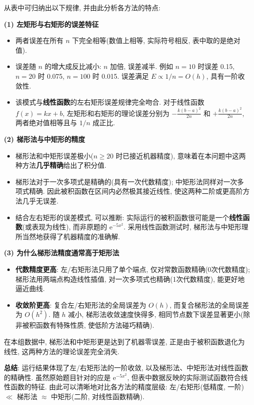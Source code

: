 \documentclass[zihao=-4,a4paper]{ctexart}
\begin{document}
从表中可归纳出以下规律, 并由此分析各方法的特点: 

\textbf{(1) 左矩形与右矩形的误差特征}
\begin{itemize}[rightmargin=0.5cm]
    \item 两者误差在所有 $n$ 下完全相等(数值上相等, 实际符号相反, 表中取的是绝对值). 
    \item 误差随 $n$ 的增大成反比减小: $n$ 加倍, 误差减半. 例如 $n=10$ 时误差 0.15, $n=20$ 时 0.075, $n=100$ 时 0.015. 误差满足 $E \propto 1/n = O(h)$, 具有一阶收敛性. 
    \item 该模式与\textbf{线性函数}的左右矩形误差规律完全吻合. 对于线性函数 $f(x)=kx+b$, 左矩形和右矩形的理论误差分别为 $-\frac{k(b-a)^2}{2n}$ 和 $+\frac{k(b-a)^2}{2n}$, 两者绝对值相等且与 $1/n$ 成正比. 
\end{itemize}

\textbf{(2) 梯形法与中矩形的精度}
\begin{itemize}[rightmargin=0.5cm]
    \item 梯形法和中矩形误差极小($n\ge20$ 时已接近机器精度), 意味着在本问题中这两种方法\textbf{几乎精确}给出了积分值. 
    \item 梯形法对于一次多项式是精确的(具有一次代数精度); 中矩形法同样对一次多项式精确. 因此被积函数在区间内必然极其接近线性, 使这两种二阶或更高阶方法几乎无误差. 
    \item 结合左右矩形的误差模式, 可以推断: 实际运行的被积函数很可能是一个\textbf{线性函数}(或表现为线性), 而非原题的 $\mathrm{e}^{-5x^2}$. 采用线性函数测试时, 梯形法与中矩形理所当然地获得了机器精度的准确解. 
\end{itemize}

\textbf{(3) 为什么梯形法精度通常高于矩形法}
\begin{itemize}[rightmargin=0.5cm]
    \item \textbf{代数精度更高}: 左/右矩形法只用了单个端点, 仅对常数函数精确(0次代数精度); 梯形法用两端点构造线性插值, 对一次多项式也精确(1次代数精度), 能更好地逼近曲线. 
    \item \textbf{收敛阶更高}: 复合左/右矩形法的全局误差为 $O(h)$, 而复合梯形法的全局误差为 $O(h^2)$. 随 $h$ 减小, 梯形法收敛速度快得多, 相同节点数下误差显著更小(除非被积函数有特殊性质, 使低阶方法碰巧精确). 
\end{itemize}

在本组数据中, 梯形法和中矩形更是达到了机器零误差, 正是由于被积函数退化为线性, 这两种方法的理论误差完全消失. 

\textbf{总结}: 运行结果体现了左/右矩形法的一阶收敛, 以及梯形法、中矩形法对线性函数的精确性. 虽然原始题目针对的应是 $\mathrm{e}^{-5x^2}$, 但表中数据反映的实际测试函数符合线性函数的特征. 由此可以清晰地对比各方法的精度层级: 左/右矩形(低精度, 一阶) $\ll$ 梯形法 $\approx$ 中矩形(二阶, 对线性函数精确). 
\end{document}
